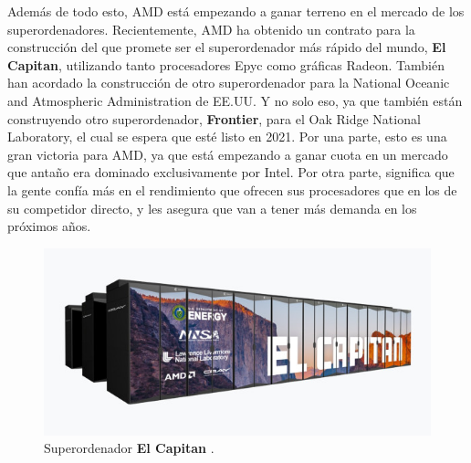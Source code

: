 \documentclass[11pt,a4paper]{article}
\begin{document}
Además de todo esto, AMD está empezando a ganar terreno en el mercado de los superordenadores.
Recientemente, AMD ha obtenido un contrato para la construcción del que promete ser el
superordenador más rápido del mundo, \textbf{El Capitan}, utilizando tanto procesadores Epyc como
gráficas Radeon. También han acordado la construcción de otro superordenador para la National
Oceanic and Atmospheric Administration de EE.UU. Y no solo eso, ya que también están construyendo
otro superordenador, \textbf{Frontier}, para el Oak Ridge National Laboratory,  el cual se espera
que esté listo en 2021. Por una parte, esto es una gran victoria para AMD, ya que está empezando a
ganar cuota en un mercado que antaño era dominado exclusivamente por Intel. Por otra parte,
significa que la gente confía más en el rendimiento que ofrecen sus procesadores que en los de su
competidor directo, y les asegura que van a tener más demanda en los próximos años.

\begin{figure}[H]
  \centering
  \includegraphics[scale=0.7]{img/amd-el-capitan}
  \caption{Superordenador \textbf{El Capitan} \cite{venturebeat}.}
\end{figure}

\newpage
\end{document}
